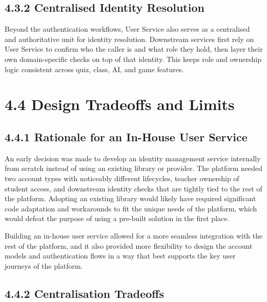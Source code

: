 \documentclass[
  12pt,
  a4paper,
]{report}
\begin{document}
\hypertarget{centralised-identity-resolution}{%
\subsection{4.3.2 Centralised Identity
Resolution}\label{centralised-identity-resolution}}

Beyond the authentication workflows, User Service also serves as a
centralised and authoritative unit for identity resolution. Downstream
services first rely on User Service to confirm who the caller is and
what role they hold, then layer their own domain-specific checks on top
of that identity. This keeps role and ownership logic consistent across
quiz, class, AI, and game features.

\hypertarget{design-tradeoffs-and-limits}{%
\section{4.4 Design Tradeoffs and
Limits}\label{design-tradeoffs-and-limits}}

\hypertarget{rationale-for-an-in-house-user-service}{%
\subsection{4.4.1 Rationale for an In-House User
Service}\label{rationale-for-an-in-house-user-service}}

An early decision was made to develop an identity management service internally from
scratch instead of using an existing library or provider. The
platform needed two account types with noticeably different lifecycles,
teacher ownership of student access, and downstream identity checks that
are tightly tied to the rest of the platform. Adopting an existing
library would likely have required significant code adaptation and workarounds
to fit the unique needs of the platform, which would defeat the
purpose of using a pre-built solution in the first place.

Building an in-house user service allowed for a more seamless integration
with the rest of the platform, and it also provided more flexibility to
design the account models and authentication flows in a way that best
supports the key user journeys of the platform.

\hypertarget{centralisation-tradeoffs}{%
\subsection{4.4.2 Centralisation
Tradeoffs}\label{centralisation-tradeoffs}}
\end{document}
